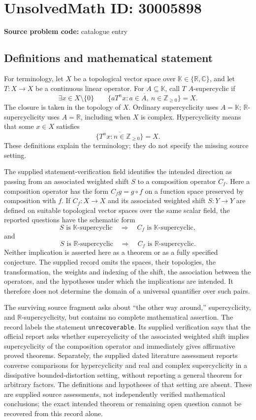 \documentclass[11pt]{article}
\newcommand{\Z}{\mathbb{Z}}
\newcommand{\R}{\mathbb{R}}
\newcommand{\C}{\mathbb{C}}
\begin{document}
\section*{UnsolvedMath ID: 30005898}
\textbf{Source problem code:} catalogue entry
\subsection{Definitions and mathematical statement}
For terminology, let \(X\) be a topological vector space over \(\mathbb K\in\{\R,\C\}\), and let \(T:X\to X\) be a continuous linear operator. For \(A\subseteq\mathbb K\), call \(T\) \(A\)-supercyclic if
\[
\exists x\in X\setminus\{0\}\qquad
\overline{\{aT^n x:a\in A,\ n\in\Z_{\geq 0}\}}=X.
\]
The closure is taken in the topology of \(X\). Ordinary supercyclicity uses \(A=\mathbb K\); \(\R\)-supercyclicity uses \(A=\R\), including when \(X\) is complex. Hypercyclicity means that some \(x\in X\) satisfies
\[
\overline{\{T^n x:n\in\Z_{\geq 0}\}}=X.
\]
These definitions explain the terminology; they do not specify the missing source setting.

The supplied statement-verification field identifies the intended direction as passing from an associated weighted shift \(S\) to a composition operator \(C_f\). Here a composition operator has the form \(C_f g=g\circ f\) on a function space preserved by composition with \(f\). If \(C_f:X\to X\) and its associated weighted shift \(S:Y\to Y\) are defined on suitable topological vector spaces over the same scalar field, the reported questions have the schematic form
\[
S\text{ is }\mathbb K\text{-supercyclic}
\quad\Longrightarrow\quad
C_f\text{ is }\mathbb K\text{-supercyclic},
\]
and
\[
S\text{ is }\R\text{-supercyclic}
\quad\Longrightarrow\quad
C_f\text{ is }\R\text{-supercyclic}.
\]
Neither implication is asserted here as a theorem or as a fully specified conjecture. The supplied record omits the spaces, their topologies, the transformation, the weights and indexing of the shift, the association between the operators, and the hypotheses under which the implications are intended. It therefore does not determine the domain of a universal quantifier over such pairs.

The surviving source fragment asks about ``the other way around,'' supercyclicity, and \(\R\)-supercyclicity, but contains no complete mathematical assertion. The record labels the statement \texttt{unrecoverable}. Its supplied verification says that the official report asks whether supercyclicity of the associated weighted shift implies supercyclicity of the composition operator and immediately gives affirmative proved theorems. Separately, the supplied dated literature assessment reports converse comparisons for hypercyclicity and real and complex supercyclicity in a dissipative bounded-distortion setting, without reporting a general theorem for arbitrary factors. The definitions and hypotheses of that setting are absent. These are supplied source assessments, not independently verified mathematical conclusions; the exact intended theorem or remaining open question cannot be recovered from this record alone.
\end{document}
